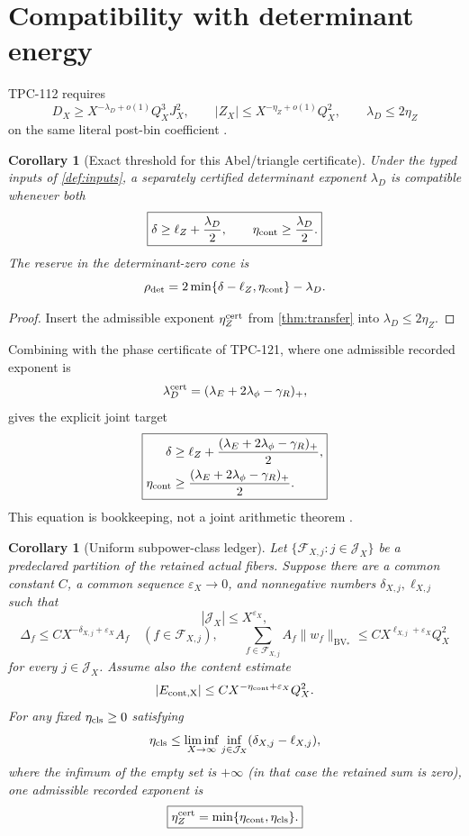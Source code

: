 \documentclass[11pt]{article}
\newtheorem{corollary}[theorem]{Corollary}
\theoremstyle{definition}
\theoremstyle{remark}
\newcommand{\cF}{\mathcal F}
\begin{document}
\section{Compatibility with determinant energy}

TPC-112 requires
\[
 D_X\ge X^{-\lambda_D+o(1)}Q_X^3J_X^2,
\qquad
 |Z_X|\le X^{-\eta_Z+o(1)}Q_X^2,
\qquad
 \lambda_D\le2\eta_Z
\]
on the same literal post-bin coefficient \citep{WangTPC112}.

\begin{corollary}[Exact threshold for this Abel/triangle certificate]
\label{cor:threshold}
Under the typed inputs of \cref{def:inputs}, a separately certified
determinant exponent \(\lambda_D\) is compatible whenever both
\[
 \boxed{
 \delta\ge\ell_Z+\frac{\lambda_D}{2},
 \qquad
 \eta_{\rm cont}\ge\frac{\lambda_D}{2}.}
\]
The reserve in the determinant-zero cone is
\[
 \rho_{\rm det}
 =
 2\min\{\delta-\ell_Z,\eta_{\rm cont}\}-\lambda_D.
\]
\end{corollary}

\begin{proof}
Insert the admissible exponent \(\eta_Z^{\rm cert}\) from
\cref{thm:transfer} into \(\lambda_D\le2\eta_Z\).
\end{proof}

Combining with the phase certificate of TPC-121, where one admissible
recorded exponent is
\[
\lambda_D^{\rm cert}
=(\lambda_E+2\lambda_\phi-\gamma_R)_+,
\]
gives the explicit joint target
\[
 \boxed{\begin{aligned}
 \delta&\ge
 \ell_Z+
 \frac{(\lambda_E+2\lambda_\phi-\gamma_R)_+}{2},\\
 \eta_{\rm cont}&\ge
 \frac{(\lambda_E+2\lambda_\phi-\gamma_R)_+}{2}.
 \end{aligned}}
\]
This equation is bookkeeping, not a joint arithmetic theorem
\citep{WangTPC121}.

\begin{corollary}[Uniform subpower-class ledger]
\label{cor:classes}
Let \(\{\cF_{X,j}:j\in\mathcal J_X\}\) be a predeclared partition of
the retained actual fibers.  Suppose there are a common constant
\(C\), a common sequence \(\varepsilon_X\to0\), and nonnegative
numbers \(\delta_{X,j},\ell_{X,j}\) such that
\[
 |\mathcal J_X|\le X^{\varepsilon_X},
\]
\[
 \Delta_f\le
 C X^{-\delta_{X,j}+\varepsilon_X}A_f
 \quad(f\in\cF_{X,j}),
 \qquad
 \sum_{f\in\cF_{X,j}}
 A_f\|w_f\|_{\mathrm{BV}_*}
 \le C X^{\ell_{X,j}+\varepsilon_X}Q_X^2
\]
for every \(j\in\mathcal J_X\).  Assume also the content estimate
\[
 |E_{\rm cont,X}|
 \le C X^{-\eta_{\rm cont}+\varepsilon_X}Q_X^2.
\]
For any fixed \(\eta_{\rm cls}\ge0\) satisfying
\[
 \eta_{\rm cls}
 \le
 \liminf_{X\to\infty}
 \inf_{j\in\mathcal J_X}(\delta_{X,j}-\ell_{X,j}),
\]
where the infimum of the empty set is \(+\infty\) (in that case the
retained sum is zero),
one admissible recorded exponent is
\[
 \boxed{
 \eta_Z^{\rm cert}
 =\min\{\eta_{\rm cont},\eta_{\rm cls}\}.}
\]
\end{corollary}
\end{document}
